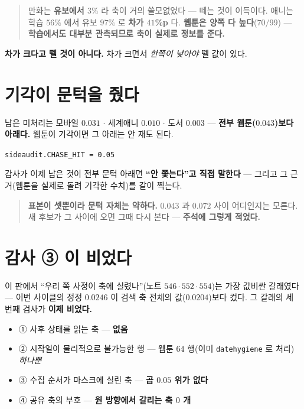 \documentclass[11pt]{article}
\begin{document}
\begin{quote}
만화는 \textbf{유보에서 $3\%$} 라 축이 거의 쓸모없었다 --- 떼는 것이
이득이다. 애니는 학습 $56\%$ 에서 유보 $97\%$ 로 \textbf{차가 $41$\%p} 다.
\textbf{웹툰은 양쪽 다 높다}($70/99$) --- \textbf{학습에서도 대부분
관측되므로 축이 실제로 정보를 준다.}
\end{quote}

\textbf{차가 크다고 뗄 것이 아니다.} 차가 크면서 \emph{한쪽이 낮아야}
뗄 값이 있다.

\section{기각이 문턱을 줬다}

남은 미처리는 모바일 $0.031$ $\cdot$ 세계애니 $0.010$ $\cdot$ 도서
$0.003$ --- \textbf{전부 웹툰($0.043$)보다 아래다.} 웹툰이 기각이면
그 아래는 안 재도 된다.

\begin{center}
\texttt{sideaudit.CHASE\_HIT = 0.05}
\end{center}

감사가 이제 남은 것이 전부 문턱 아래면 \textbf{``안 쫓는다''고 직접
말한다} --- 그리고 그 근거(웹툰을 실제로 돌려 기각한 수치)를 같이 찍는다.

\begin{quote}
\textbf{표본이 셋뿐이라 문턱 자체는 약하다.} $0.043$ 과 $0.072$ 사이
어디인지는 모른다. 새 후보가 그 사이에 오면 그때 다시 본다 ---
\textbf{주석에 그렇게 적었다.}
\end{quote}

\section*{감사 ③ 이 비었다}

이 판에서 ``우리 쪽 사정이 축에 실렸나''(노트 $546 \cdot 552 \cdot 554$)는
가장 값비싼 갈래였다 --- 이번 사이클의 정정 $0.0246$ 이 검색 축 전체의
값($0.0204$)보다 컸다. 그 갈래의 세 번째 검사가 \textbf{이제 비었다.}

\begin{itemize}
\item ① 사후 상태를 읽는 축 --- \textbf{없음}
\item ② 시작일이 물리적으로 불가능한 행 --- 웹툰 $64$ 행(이미
\texttt{datehygiene} 로 처리) \emph{하나뿐}
\item ③ 수집 순서가 마스크에 실린 축 --- \textbf{곱 $0.05$ 위가 없다}
\item ④ 공유 축의 부호 --- \textbf{원 방향에서 갈리는 축 $0$ 개}
\end{itemize}
\end{document}
